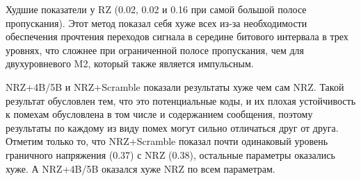 Худшие показатели у RZ (0.02, 0.02 и 0.16 при самой большой полосе пропускания). Этот метод показал себя хуже всех из-за необходимости обеспечения прочтения переходов сигнала в середине битового интервала в трех уровнях, что сложнее при ограниченной полосе пропускания, чем для двухуровневого M2, который также является импульсным.

NRZ+4B/5B и NRZ+Scramble показали результаты хуже чем сам NRZ. Такой результат обусловлен тем, что это потенциальные коды, и их плохая устойчивость к помехам обусловлена в том числе и содержанием сообщения, поэтому результаты по каждому из виду помех могут сильно отличаться друг от друга. Отметим только то, что NRZ+Scramble показал почти одинаковый уровень граничного напряжения (0.37) с NRZ (0.38), остальные параметры оказались хуже. А NRZ+4B/5B оказался хуже NRZ по всем параметрам.

